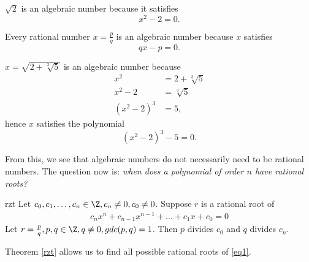 \documentclass[math1010-lecture-notes]{subfiles}
\begin{document}
\begin{example}
  $ \sqrt{2} $ is an algebraic number because it satisfies \[
  x^2-2=0
  .\] 
\end{example}

\begin{example}
  Every rational number $x=\frac{p}{q}$ is an algebraic number because $x$ satisfies \[ qx-p=0 .\] 
\end{example}

\begin{example}
  $x=\sqrt{2+\sqrt[3]{5} } $ is an algebraic number because
  \begin{align*}
    x^2 &= 2+\sqrt[3]{5}  \\
    x^2-2 &= \sqrt[3]{5}  \\
    \left( x^2-2 \right) ^3&=5
  ,\end{align*} hence $x$ satisfies the polynomial \[
    \left( x^2-2 \right) ^{3}-5=0
  .\] 
\end{example}

From this, we see that algebraic numbers do not necessarily need to be rational numbers. The
question now is: \textit{when does a polynomial of order $n$ have rational roots?} 

\begin{theorem}{rzt}
  Let $ c_0,c_1,\ldots,c_n\in \Z, c_n\neq 0,c_0\neq 0$. Suppose $r$ is a rational root of
  \begin{gather}
    c_nx^{n}+c_{n-1}x^{n-1}+\ldots+c_1x+c_0=0 \label{eq1}
  \end{gather}
  Let $r=\frac{p}{q}, p,q\in \Z,q\neq 0, gdc(p,q)=1$. Then $p$ divides $ c_0$ and $q$ divides $c_n$.
\end{theorem}
\begin{remark}
  Theorem \ref{rzt} allows us to find all possible rational roots of \ref{eq1}.
\end{remark}
\end{document}
